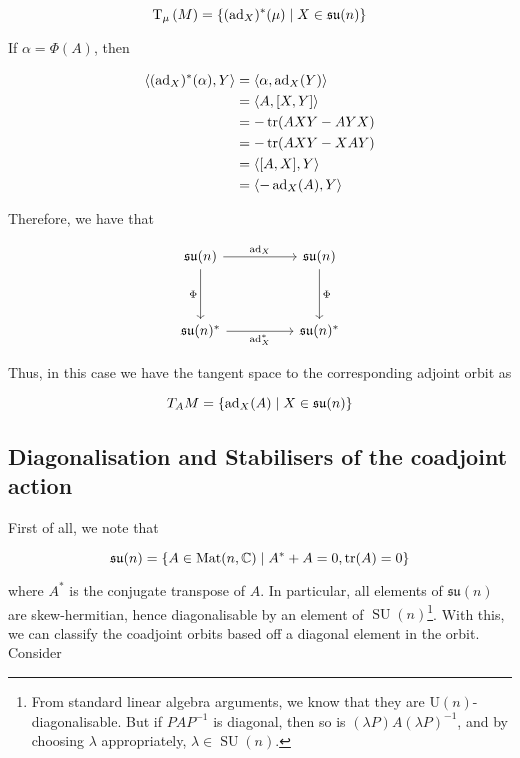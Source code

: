 \documentclass{article}
\DeclareMathOperator{\SU}{SU}
\newcommand{\su}{\mathfrak{su}}
\begin{document}
\[\T_\mu\left( M\right) = \left\{(\ad_X)^*(\mu) \mid X \in \su(n)\right\}\]

If \(\alpha= \Phi(A)\), then

\begin{align*}
    \left\langle (\operatorname{ad}_X)^*(\alpha), Y \right\rangle &= \left\langle \alpha, \operatorname{ad}_X(Y) \right\rangle \\
    &= \left\langle A, [X, Y] \right\rangle \\
    &= -\tr(AXY - AYX) \\
    &= -\tr(AXY - XAY) \\
    &= \left\langle [A, X], Y \right\rangle \\
    &= \left\langle -\operatorname{ad}_X(A), Y \right\rangle
\end{align*}

Therefore, we have that

\[\begin{tikzcd}
	{\su(n)} && {\su(n)} \\
	\\
	{\su(n)^*} && {\su(n)^*}
	\arrow["\Phi"', from=1-1, to=3-1]
	\arrow["\Phi", from=1-3, to=3-3]
	\arrow["{\ad_X}", from=1-1, to=1-3]
	\arrow["{\ad_X^*}"', from=3-1, to=3-3]
\end{tikzcd}\]

Thus, in this case we have the tangent space to the corresponding adjoint orbit as

\[T_A M = \left\{\ad_X(A) \mid X \in \su(n)\right\}\]

\subsection{Diagonalisation and Stabilisers of the coadjoint action}

First of all, we note that

\[\su(n) = \left\{A \in \Mat(n, \C) \mid A^* + A = 0, \tr(A) = 0\right\}\]

where \(A^*\) is the conjugate transpose of \(A\). In particular, all elements of \(\su(n)\) are skew-hermitian, hence diagonalisable by an element of \(\SU(n)\)\footnote{From standard linear algebra arguments, we know that they are \(\mathrm U(n)\)-diagonalisable. But if \(PAP^{-1}\) is diagonal, then so is \((\lambda P)A(\lambda P)^{-1}\), and by choosing \(\lambda\) appropriately, \(\lambda \in \SU(n)\).}. With this, we can classify the coadjoint orbits based off a diagonal element in the orbit. Consider
\end{document}
